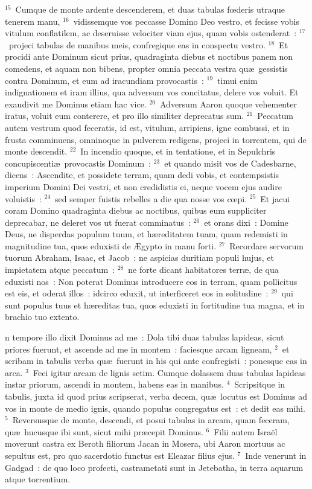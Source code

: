 ${}^{15}$~Cumque de monte ardente descenderem, et duas tabulas fœderis utraque tenerem manu,
${}^{16}$~vidissemque vos peccasse Domino Deo vestro, et fecisse vobis vitulum conflatilem, ac deseruisse velociter viam ejus, quam vobis ostenderat~:
${}^{17}$~projeci tabulas de manibus meis, confregique eas in conspectu vestro.
${}^{18}$~Et procidi ante Dominum sicut prius, quadraginta diebus et noctibus panem non comedens, et aquam non bibens, propter omnia peccata vestra qu\ae\ gessistis contra Dominum, et eum ad iracundiam provocastis~:
${}^{19}$~timui enim indignationem et iram illius, qua adversum vos concitatus, delere vos voluit. Et exaudivit me Dominus etiam hac vice.
${}^{20}$~Adversum Aaron quoque vehementer iratus, voluit eum conterere, et pro illo similiter deprecatus sum.
${}^{21}$~Peccatum autem vestrum quod feceratis, id est, vitulum, arripiens, igne combussi, et in frusta comminuens, omninoque in pulverem redigens, projeci in torrentem, qui de monte descendit.
${}^{22}$~In incendio quoque, et in tentatione, et in Sepulchris concupiscenti\ae\ provocastis Dominum~:
${}^{23}$~et quando misit vos de Cadesbarne, dicens~: Ascendite, et possidete terram, quam dedi vobis, et contempsistis imperium Domini Dei vestri, et non credidistis ei, neque vocem ejus audire voluistis~:
${}^{24}$~sed semper fuistis rebelles a die qua nosse vos cœpi.
${}^{25}$~Et jacui coram Domino quadraginta diebus ac noctibus, quibus eum suppliciter deprecabar, ne deleret vos ut fuerat comminatus~:
${}^{26}$~et orans dixi~: Domine Deus, ne disperdas populum tuum, et h\ae reditatem tuam, quam redemisti in magnitudine tua, quos eduxisti de \AE gypto in manu forti.
${}^{27}$~Recordare servorum tuorum Abraham, Isaac, et Jacob~: ne aspicias duritiam populi hujus, et impietatem atque peccatum~:
${}^{28}$~ne forte dicant habitatores terr\ae , de qua eduxisti nos~: Non poterat Dominus introducere eos in terram, quam pollicitus est eis, et oderat illos~: idcirco eduxit, ut interficeret eos in solitudine~:
${}^{29}$~qui sunt populus tuus et h\ae reditas tua, quos eduxisti in fortitudine tua magna, et in brachio tuo extento.

\bchapter
{}n tempore illo dixit Dominus ad me~: Dola tibi duas tabulas lapideas, sicut priores fuerunt, et ascende ad me in montem~: faciesque arcam ligneam,
${}^{2}$~et scribam in tabulis verba qu\ae\ fuerunt in his qui ante confregisti~: ponesque eas in arca.
${}^{3}$~Feci igitur arcam de lignis setim. Cumque dolassem duas tabulas lapideas instar priorum, ascendi in montem, habens eas in manibus.
${}^{4}$~Scripsitque in tabulis, juxta id quod prius scripserat, verba decem, qu\ae\ locutus est Dominus ad vos in monte de medio ignis, quando populus congregatus est~: et dedit eas mihi.
${}^{5}$~Reversusque de monte, descendi, et posui tabulas in arcam, quam feceram, qu\ae\ hucusque ibi sunt, sicut mihi pr\ae cepit Dominus.
${}^{6}$~Filii autem Isra\"el moverunt castra ex Beroth filiorum Jacan in Mosera, ubi Aaron mortuus ac sepultus est, pro quo sacerdotio functus est Eleazar filius ejus.
${}^{7}$~Inde venerunt in Gadgad~: de quo loco profecti, castrametati sunt in Jetebatha, in terra aquarum atque torrentium.


